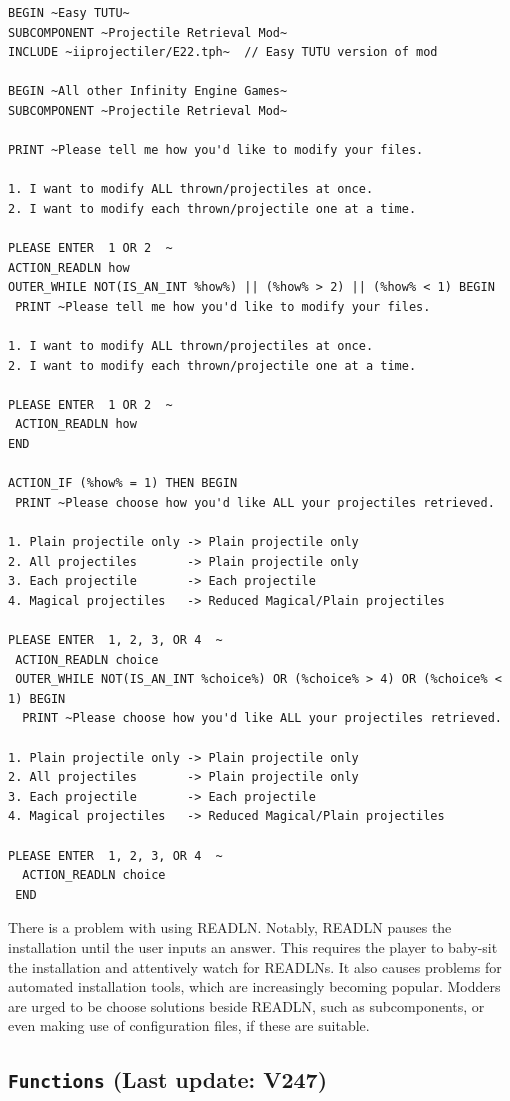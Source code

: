 \documentclass{article}
\def\t#1{{\tt #1}}
\begin{document}
\begin{verbatim}
BEGIN ~Easy TUTU~
SUBCOMPONENT ~Projectile Retrieval Mod~
INCLUDE ~iiprojectiler/E22.tph~  // Easy TUTU version of mod

BEGIN ~All other Infinity Engine Games~
SUBCOMPONENT ~Projectile Retrieval Mod~

PRINT ~Please tell me how you'd like to modify your files.

1. I want to modify ALL thrown/projectiles at once.
2. I want to modify each thrown/projectile one at a time.

PLEASE ENTER  1 OR 2  ~
ACTION_READLN how
OUTER_WHILE NOT(IS_AN_INT %how%) || (%how% > 2) || (%how% < 1) BEGIN
 PRINT ~Please tell me how you'd like to modify your files.

1. I want to modify ALL thrown/projectiles at once.
2. I want to modify each thrown/projectile one at a time.

PLEASE ENTER  1 OR 2  ~
 ACTION_READLN how
END

ACTION_IF (%how% = 1) THEN BEGIN
 PRINT ~Please choose how you'd like ALL your projectiles retrieved.

1. Plain projectile only -> Plain projectile only
2. All projectiles       -> Plain projectile only
3. Each projectile       -> Each projectile
4. Magical projectiles   -> Reduced Magical/Plain projectiles

PLEASE ENTER  1, 2, 3, OR 4  ~
 ACTION_READLN choice
 OUTER_WHILE NOT(IS_AN_INT %choice%) OR (%choice% > 4) OR (%choice% < 1) BEGIN
  PRINT ~Please choose how you'd like ALL your projectiles retrieved.

1. Plain projectile only -> Plain projectile only
2. All projectiles       -> Plain projectile only
3. Each projectile       -> Each projectile
4. Magical projectiles   -> Reduced Magical/Plain projectiles

PLEASE ENTER  1, 2, 3, OR 4  ~
  ACTION_READLN choice
 END
\end{verbatim}

There is a problem with using READLN. Notably, READLN pauses the
installation until the user inputs an answer. This requires the player
to baby-sit the installation and attentively watch for READLNs. It
also causes problems for automated installation tools, which are
increasingly becoming popular. Modders are urged to be choose
solutions beside READLN, such as subcomponents, or even making use of
configuration files, if these are suitable.

\label{sec-functions}\subsection{\t{Functions} (Last update: V247)}
\end{document}
